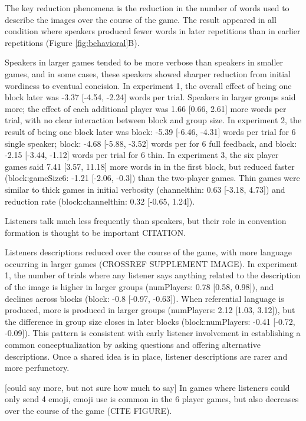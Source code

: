 \documentclass[
  english,
  a4paper,
]{article}
\begin{document}
The key reduction phenomena is the reduction in the number of words used to describe the images over the course of the game. The result appeared in all condition where speakers produced fewer words in later repetitions than in earlier repetitions (Figure \ref{fig:behavioral}B).

Speakers in larger games tended to be more verbose than speakers in smaller games, and in some cases, these speakers showed sharper reduction from initial wordiness to eventual concision. In experiment 1, the overall effect of being one block later was -3.37 {[}-4.54, -2.24{]} words per trial. Speakers in larger groups said more; the effect of each additional player was 1.66 {[}0.66, 2.61{]} more words per trial, with no clear interaction between block and group size. In experiment 2, the result of being one block later was block: -5.39 {[}-6.46, -4.31{]} words per trial for 6 single speaker; block: -4.68 {[}-5.88, -3.52{]} words per for 6 full feedback, and block: -2.15 {[}-3.44, -1.12{]} words per trial for 6 thin. In experiment 3, the six player games said 7.41 {[}3.57, 11.18{]} more words in in the first block, but reduced faster (block:gameSize6: -1.21 {[}-2.06, -0.3{]}) than the two-player games. Thin games were similar to thick games in initial verbosity (channelthin: 0.63 {[}-3.18, 4.73{]}) and reduction rate (block:channelthin: 0.32 {[}-0.65, 1.24{]}).

Listeners talk much less frequently than speakers, but their role in convention formation is thought to be important CITATION.

Listeners descriptions reduced over the course of the game, with more language occurring in larger games (CROSSREF SUPPLEMENT IMAGE). In experiment 1, the number of trials where any listener says anything related to the description of the image is higher in larger groups (numPlayers: 0.78 {[}0.58, 0.98{]}), and declines across blocks (block: -0.8 {[}-0.97, -0.63{]}). When referential language is produced, more is produced in larger groups (numPlayers: 2.12 {[}1.03, 3.12{]}), but the difference in group size closes in later blocks (block:numPlayers: -0.41 {[}-0.72, -0.09{]}). This pattern is consistent with early listener involvement in establishing a common conceptualization by asking questions and offering alternative descriptions. Once a shared idea is in place, listener descriptions are rarer and more perfunctory.

{[}could say more, but not sure how much to say{]} In games where listeners could only send 4 emoji, emoji use is common in the 6 player games, but also decreases over the course of the game (CITE FIGURE).
\end{document}
